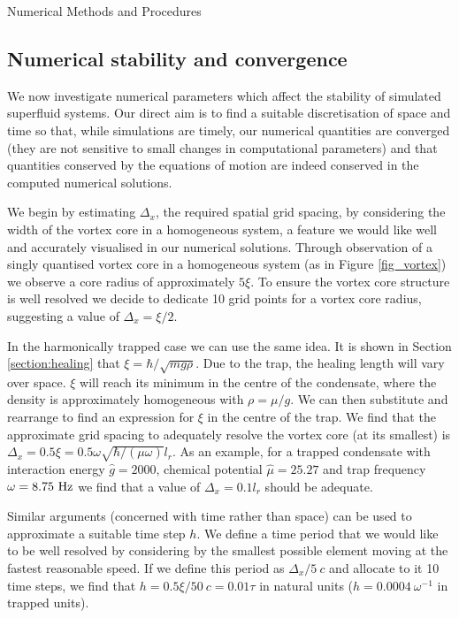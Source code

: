 \begin{chapter}{\label{cha:numerics}Numerical Methods and Procedures}
	\subsection{\label{section:numericalParams} Numerical stability and convergence}
	We now investigate numerical parameters which affect the stability of simulated superfluid systems. Our direct aim is to find a suitable discretisation of space and time so that, while simulations are timely, our numerical quantities are converged (they are not sensitive to small changes in computational parameters) and that quantities conserved by the equations of motion are indeed conserved in the computed numerical solutions.

	We begin by estimating $\Delta_x$, the required spatial grid spacing, by considering the width of the vortex core in a homogeneous system, a feature we would like well and accurately visualised in our numerical solutions. Through observation of a singly quantised vortex core in a homogeneous system (as in Figure \ref{fig_vortex}) we observe a core radius of approximately $5\xi$. To ensure the vortex core structure is well resolved we decide to dedicate 10 grid points for a vortex core radius, suggesting a value of $\Delta_x = \xi/2$.

	In the harmonically trapped case we can use the same idea. It is shown in Section \ref{section:healing} that $\xi = \hbar/\sqrt{mg\rho}$. Due to the trap, the healing length will vary over space. $\xi$ will reach its minimum in the centre of the condensate, where the density is approximately homogeneous with $\rho=\mu/g$. We can then substitute and rearrange to find an expression for $\xi$ in the centre of the trap. We find that the approximate grid spacing to adequately resolve the vortex core (at its smallest) is $\Delta_x = 0.5\xi = 0.5\omega \sqrt{\hbar/(\mu \omega)} l_r$. As an example, for a trapped condensate with interaction energy $\hat{g}=2000$, chemical potential $\hat{\mu}=25.27$ and trap frequency $\omega=8.75~{\rm Hz}$ we find that a value of $\Delta_x=0.1l_r$ should be adequate.

	Similar arguments (concerned with time rather than space) can be used to approximate a suitable time step $h$. We define a time period that we would like to be well resolved by considering by the smallest possible element moving at the fastest reasonable speed. If we define this period as $\Delta_x / 5~c$ and allocate to it 10 time steps, we find that $h = 0.5\xi/50~c = 0.01\tau$ in natural units ($h=0.0004~\omega^{-1}$ in trapped units).


\end{chapter}
